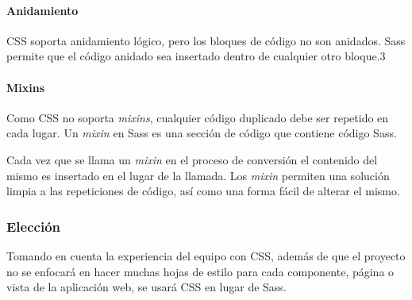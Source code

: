 \paragraph*{Anidamiento}
CSS soporta anidamiento lógico, pero los bloques de código no son anidados. Sass permite que el código anidado sea insertado dentro de cualquier otro bloque.3


\paragraph*{Mixins}

Como CSS no soporta \textit{mixins}, cualquier código duplicado debe ser repetido en cada lugar. Un \textit{mixin} en Sass es una sección de código que contiene código Sass. 


Cada vez que se llama un \textit{mixin} en el proceso de conversión el contenido del mismo es insertado en el lugar de la llamada. Los \textit{mixin} permiten una solución limpia a las repeticiones de código, así como una forma fácil de alterar el mismo.



\subsubsection*{Elección}

Tomando en cuenta la experiencia del equipo con CSS, además de que el proyecto no se enfocará en hacer muchas hojas de estilo para cada componente, página o vista de la aplicación web, se usará CSS en lugar de Sass.